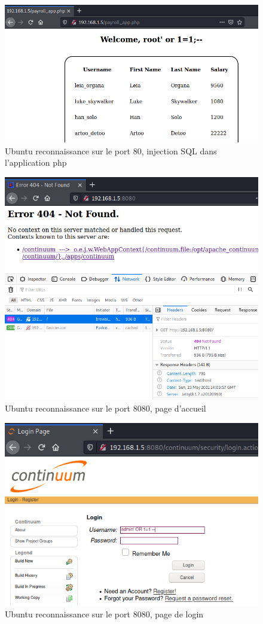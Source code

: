 \documentclass[a4paper]{article}
\begin{document}
\begin{figure}[H]
    \centering
    \includegraphics[width=0.90\linewidth]{images/reconnaissance-20.PNG}
    \caption{Ubuntu reconnaissance sur le port 80, injection SQL dans l'application php}
    \label{fig:reconnaissance20}
\end{figure}

\begin{figure}[H]
    \centering
    \includegraphics[width=0.80\linewidth]{images/reconnaissance-13.PNG}
    \caption{Ubuntu reconnaissance sur le port 8080, page d'accueil}
    \label{fig:reconnaissance13}
\end{figure}
\begin{figure}[H]
    \centering
    \includegraphics[width=0.75\linewidth]{images/reconnaissance-16.PNG}
    \caption{Ubuntu reconnaissance sur le port 8080, page de login}
    \label{fig:reconnaissance15}
\end{figure}
\end{document}
